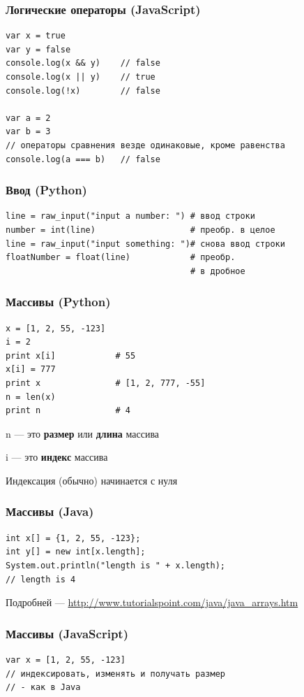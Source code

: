 {\begin{frame}[fragile]
  \frametitle{Логические операторы (JavaScript)}
  \begin{verbatim}
var x = true
var y = false
console.log(x && y)    // false
console.log(x || y)    // true
console.log(!x)        // false

var a = 2
var b = 3
// операторы сравнения везде одинаковые, кроме равенства
console.log(a === b)   // false
  \end{verbatim}
\end{frame}

\begin{frame}[fragile]
  \frametitle{Ввод (Python)}
  \begin{verbatim}
line = raw_input("input a number: ") # ввод строки
number = int(line)                   # преобр. в целое
line = raw_input("input something: ")# снова ввод строки
floatNumber = float(line)            # преобр.
                                     # в дробное
  \end{verbatim}
\end{frame}

\begin{frame}[fragile]
  \frametitle{Массивы (Python)}
  \begin{verbatim}
x = [1, 2, 55, -123]
i = 2
print x[i]            # 55
x[i] = 777
print x               # [1, 2, 777, -55]
n = len(x)
print n               # 4
  \end{verbatim}

  \vspace{0.5cm}
  n --- это \textbf{размер} или \textbf{длина} массива

  i --- это \textbf{индекс} массива

  Индексация (обычно) начинается с нуля
\end{frame}

\begin{frame}[fragile]
  \frametitle{Массивы (Java)}
  \begin{verbatim}
int x[] = {1, 2, 55, -123};
int y[] = new int[x.length];
System.out.println("length is " + x.length);
// length is 4
  \end{verbatim}

  \vspace{0.5cm}
  Подробней --- \url{http://www.tutorialspoint.com/java/java\_arrays.htm}
\end{frame}

\begin{frame}[fragile]
  \frametitle{Массивы (JavaScript)}
  \begin{verbatim}
var x = [1, 2, 55, -123]
// индексировать, изменять и получать размер
// - как в Java
  \end{verbatim}


\end{frame}}
